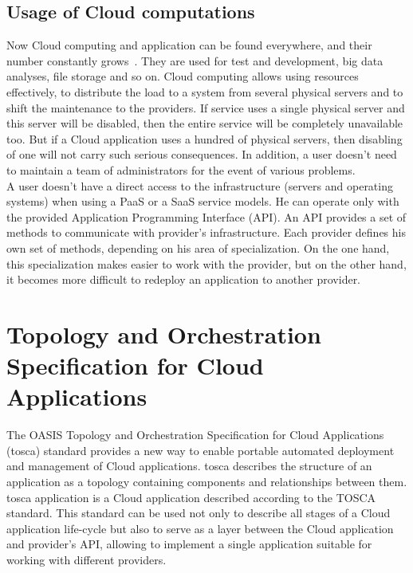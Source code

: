 \subsection*{Usage of Cloud computations}
Now Cloud computing and application can be found everywhere, and their number constantly grows~\cite*{cloud_stat}.
They are used for test and development, big data analyses, file storage and so on.
Cloud computing allows using resources effectively, to distribute the load to a system from several physical servers and to shift the maintenance to the providers. 
If service uses a single physical server and this server will be disabled, then the entire service will be completely unavailable too.
But if a Cloud application uses a hundred of physical servers, then disabling of one will not carry such serious consequences.
In addition, a user doesn't need to maintain a team of administrators for the event of various problems.\\
A user doesn't have a direct access to the infrastructure (servers and operating systems) when using a PaaS or a SaaS service models. He can operate only with the provided Application Programming Interface (API).
An API provides a set of methods to communicate with provider's infrastructure. 
Each provider defines his own set of methods, depending on his area of specialization. 
On the one hand, this specialization makes easier to work with the provider, but on the other hand, it becomes more difficult to redeploy an application to another provider.

\section{Topology and Orchestration Specification for Cloud	Applications} \label{sec:tosca}
The OASIS \cite{oasis} Topology and Orchestration Specification for Cloud Applications (\gls{tosca}) standard provides a new way to enable portable automated deployment and management of Cloud applications.
\gls{tosca} describes the structure of an application as a topology containing components and relationships between them.
\gls{tosca} application is a Cloud application described according to the TOSCA standard.
This standard can be used not only to describe all stages of a Cloud application life-cycle but also to serve as a layer between the Cloud application and provider's API, allowing to implement a single application suitable for working with different providers. 

